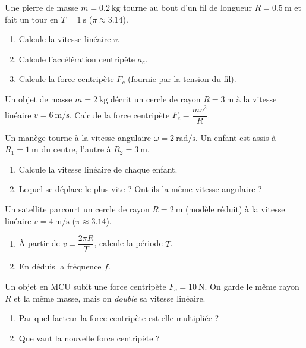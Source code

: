 \documentclass[11pt,a4paper]{article}
\begin{document}

\begin{exo}
Une pierre de masse $m=\qty{0,2}{\kilogram}$ tourne au bout d'un fil de longueur $R=\qty{0,5}{\metre}$ et
fait un tour en $T=\qty{1}{\second}$ ($\pi\approx\num{3,14}$).
\begin{enumerate}[label=\alph*)]
  \item Calcule la vitesse linéaire $v$.
  \item Calcule l'accélération centripète $a_c$.
  \item Calcule la force centripète $F_c$ (fournie par la tension du fil).
\end{enumerate}
\end{exo}

\begin{exo}
Un objet de masse $m=\qty{2}{\kilogram}$ décrit un cercle de rayon $R=\qty{3}{\metre}$ à la vitesse
linéaire $v=\qty{6}{\metre\per\second}$. Calcule la force centripète $F_c=\dfrac{mv^2}{R}$.
\end{exo}

\begin{exo}
Un manège tourne à la vitesse angulaire $\omega=\qty{2}{\radian\per\second}$. Un enfant est assis à
$R_1=\qty{1}{\metre}$ du centre, l'autre à $R_2=\qty{3}{\metre}$.
\begin{enumerate}[label=\alph*)]
  \item Calcule la vitesse linéaire de chaque enfant.
  \item Lequel se déplace le plus vite ? Ont-ils la même vitesse angulaire ?
\end{enumerate}
\end{exo}

\begin{exo}
Un satellite parcourt un cercle de rayon $R=\qty{2}{\metre}$ (modèle réduit) à la vitesse linéaire
$v=\qty{4}{\metre\per\second}$ ($\pi\approx\num{3,14}$).
\begin{enumerate}[label=\alph*)]
  \item À partir de $v=\dfrac{2\pi R}{T}$, calcule la période $T$.
  \item En déduis la fréquence $f$.
\end{enumerate}
\end{exo}

\begin{exo}
Un objet en MCU subit une force centripète $F_c=\qty{10}{\newton}$. On garde le même rayon $R$ et la
même masse, mais on \emph{double} sa vitesse linéaire.
\begin{enumerate}[label=\alph*)]
  \item Par quel facteur la force centripète est-elle multipliée ?
  \item Que vaut la nouvelle force centripète ?
\end{enumerate}
\end{exo}
\end{document}
